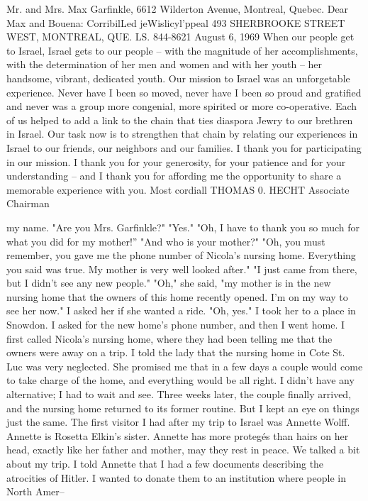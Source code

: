 Mr.
and Mrs.
Max Garfinkle, 
6612 Wilderton Avenue, 
Montreal, Quebec.
Dear Max and Bouena: 
CorribilLed jeWislicyl'ppeal 
493 SHERBROOKE STREET WEST, MONTREAL, QUE.
LS.
844-8621 
August 6, 1969 
When our people get to Israel, Israel gets to our 
people -- with the magnitude of her accomplishments, with the 
determination of her men and women and with her youth -- her 
handsome, vibrant, dedicated youth.
Our mission to Israel was an unforgetable experience.
Never have I been so moved, never have I been so proud and 
gratified and never was a group more congenial, more spirited 
or more co-operative.
Each of us helped to add a link to the chain that 
ties diaspora Jewry to our brethren in Israel.
Our task now 
is to strengthen that chain by relating our experiences in 
Israel to our friends, our neighbors and our families.
I thank you for participating in our mission.
I 
thank you for your generosity, for your patience and for your 
understanding -- and I thank you for affording me the opportunity 
to share a memorable experience with you.
Most cordiall 
THOMAS 0.
HECHT 
Associate Chairman 

my name.
"Are you Mrs.
Garfinkle?"
"Yes."
"Oh, I have to thank you so much for what you did for my mother!” 
"And who is your mother?"
"Oh, you must remember, you gave me the phone number of Nicola's 
nursing home.
Everything you said was true.
My mother is very well 
looked after."
"I just came from there, but I didn't see any new people."
"Oh," she said, "my mother is in the new nursing home that the 
owners of this home recently opened.
I'm on my way to see her now."
I asked her if she wanted a ride.
"Oh, yes."
I took her to a place in Snowdon.
I asked for the new home's 
phone number, and then I went home.
I first called Nicola's nursing 
home, where they had been telling me that the owners were away on 
a trip.
I told the lady that the nursing home in Cote St.
Luc was 
very neglected.
She promised me that in a few days a couple would 
come to take charge of the home, and everything would be all right.
I didn't have any alternative; I had to wait and see.
Three weeks later, the couple finally arrived, and the nursing 
home returned to its former routine.
But I kept an eye on things 
just the same.
The first visitor I had after my trip to Israel was Annette 
Wolff.
Annette is Rosetta Elkin's sister.
Annette has more protegés than hairs on her head, exactly like her father and mother, may 
they rest in peace.
We talked a bit about my trip.
I told Annette 
that I had a few documents describing the atrocities of Hitler.
I 
wanted to donate them to an institution where people in North Amer--

